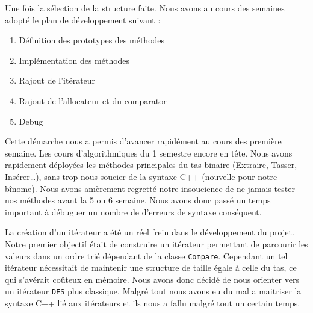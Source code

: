 Une fois la sélection de la structure faite. Nous avons au cours des semaines adopté le plan de développement suivant : 
\begin{enumerate}
\item
Définition des prototypes des méthodes
\item
Implémentation des méthodes
\item
Rajout de l'itérateur 
\item
Rajout de l'allocateur et du comparator
\item
Debug
\end{enumerate}
Cette démarche nous a permis d'avancer rapidément au cours des première semaine. Les cours d'algorithmiques du 1 semestre encore en tête. Nous avons rapidement déployées les méthodes principales du tas binaire (Extraire, Tasser, Insérer\dots), sans trop nous soucier de la syntaxe C++ (nouvelle pour notre bînome).
Nous avons amèrement regretté notre insoucience de ne jamais tester nos méthodes avant la 5 ou 6 semaine. Nous avons donc passé un temps important à débuguer un nombre de d'erreurs de syntaxe conséquent.

La création d'un itérateur a été un réel frein dans le développement du projet.\\Notre premier objectif était de construire un itérateur permettant de parcourir les valeurs dans un ordre trié dépendant de la classe \verb+Compare+. Cependant un tel itérateur nécessitait de maintenir une structure de taille égale à celle du tas, ce qui s'avérait coûteux en mémoire.
Nous avons donc décidé de nous orienter vers un itérateur \verb+DFS+ plus classique. Malgré tout nous avons eu du mal a maitriser la syntaxe C++ lié aux itérateurs et ils nous a fallu malgré tout un certain temps.
